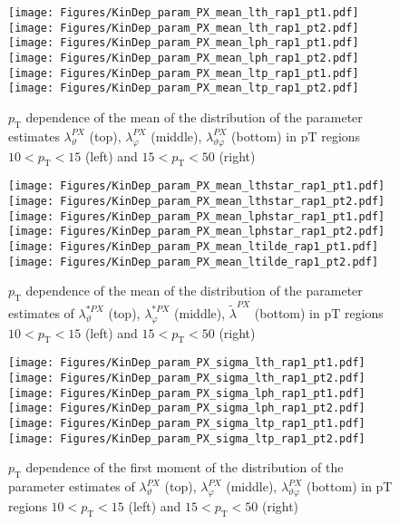\documentclass[12pt]{article}
\newcommand{\pT}{p_\mathrm{T}}
\newcommand{\lamthPX}{\lambda^{\scriptscriptstyle PX}_\vartheta}
\newcommand{\lamphPX}{\lambda^{\scriptscriptstyle PX}_\varphi}
\newcommand{\lamthphPX}{\lambda^{\scriptscriptstyle PX}_{\vartheta \varphi}}
\newcommand{\lamtildePX}{\tilde{\lambda}^{\scriptscriptstyle PX}}
\newcommand{\lamthstarPX}{\lambda^{* \scriptscriptstyle PX}_\vartheta}
\newcommand{\lamphstarPX}{\lambda^{* \scriptscriptstyle PX}_\varphi}
\begin{document}



\begin{figure}[htbp]
\centering
\texttt{[image: Figures/KinDep\_param\_PX\_mean\_lth\_rap1\_pt1.pdf]}
\texttt{[image: Figures/KinDep\_param\_PX\_mean\_lth\_rap1\_pt2.pdf]}
\texttt{[image: Figures/KinDep\_param\_PX\_mean\_lph\_rap1\_pt1.pdf]}
\texttt{[image: Figures/KinDep\_param\_PX\_mean\_lph\_rap1\_pt2.pdf]}
\texttt{[image: Figures/KinDep\_param\_PX\_mean\_ltp\_rap1\_pt1.pdf]}
\texttt{[image: Figures/KinDep\_param\_PX\_mean\_ltp\_rap1\_pt2.pdf]}
\caption{$\pT$ dependence of the mean of the distribution of the parameter estimates $\lamthPX$ (top), $\lamphPX$ (middle), $\lamthphPX$ (bottom) in pT regions $10<\pT<15$ (left) and $15<\pT<50$ (right)}
\end{figure}
\clearpage

\begin{figure}[htbp]
\centering
\texttt{[image: Figures/KinDep\_param\_PX\_mean\_lthstar\_rap1\_pt1.pdf]}
\texttt{[image: Figures/KinDep\_param\_PX\_mean\_lthstar\_rap1\_pt2.pdf]}
\texttt{[image: Figures/KinDep\_param\_PX\_mean\_lphstar\_rap1\_pt1.pdf]}
\texttt{[image: Figures/KinDep\_param\_PX\_mean\_lphstar\_rap1\_pt2.pdf]}
\texttt{[image: Figures/KinDep\_param\_PX\_mean\_ltilde\_rap1\_pt1.pdf]}
\texttt{[image: Figures/KinDep\_param\_PX\_mean\_ltilde\_rap1\_pt2.pdf]}
\caption{$\pT$ dependence of the mean of the distribution of the parameter estimates of $\lamthstarPX$ (top), $\lamphstarPX$ (middle), $\lamtildePX$ (bottom) in pT regions $10<\pT<15$ (left) and $15<\pT<50$ (right)}
\end{figure}
\clearpage


\begin{figure}[htbp]
\centering
\texttt{[image: Figures/KinDep\_param\_PX\_sigma\_lth\_rap1\_pt1.pdf]}
\texttt{[image: Figures/KinDep\_param\_PX\_sigma\_lth\_rap1\_pt2.pdf]}
\texttt{[image: Figures/KinDep\_param\_PX\_sigma\_lph\_rap1\_pt1.pdf]}
\texttt{[image: Figures/KinDep\_param\_PX\_sigma\_lph\_rap1\_pt2.pdf]}
\texttt{[image: Figures/KinDep\_param\_PX\_sigma\_ltp\_rap1\_pt1.pdf]}
\texttt{[image: Figures/KinDep\_param\_PX\_sigma\_ltp\_rap1\_pt2.pdf]}
\caption{$\pT$ dependence of the first moment of the distribution of the parameter estimates of $\lamthPX$ (top), $\lamphPX$ (middle), $\lamthphPX$ (bottom) in pT regions $10<\pT<15$ (left) and $15<\pT<50$ (right)}
\end{figure}
\clearpage
\end{document}
